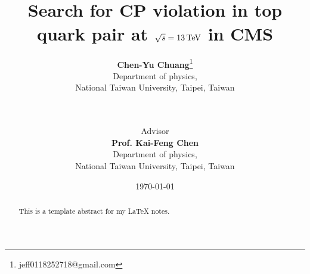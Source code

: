 \title{\aline{}\\Search for CP violation in top quark pair at $\sqrt{s} = 13\,\text{Te\hspace{-.08em}V}$ in CMS\\\aline{}}
\author{
\textbf{Chen-Yu Chuang}\thanks{jeff0118252718@gmail.com}\\
Department of physics,\\
National Taiwan University, Taipei, Taiwan\\
~\\
~\\
\and
Advisor\\
\textbf{Prof. Kai-Feng Chen}\\
Department of physics,\\
National Taiwan University, Taipei, Taiwan
}
\date{\today}
\maketitle
\thispagestyle{empty} %

\newpage
\thispagestyle{empty} %
\begin{abstract}
This is a template abstract for my \LaTeX{} notes.
\end{abstract}
\newpage

\FloatBarrier
